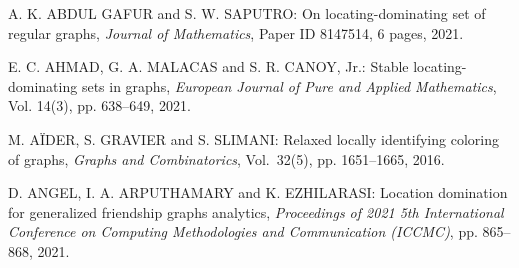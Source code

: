 \begin{thebibliography}{999}
%
%
%
%
%
%
%
%
%
%
%

A. K. ABDUL GAFUR and S. W. SAPUTRO: On locating-dominating set of regular graphs, {\it Journal of Mathematics}, Paper ID 8147514, 6 pages, 2021.

E. C. AHMAD, G. A. MALACAS and S. R. CANOY, Jr.: Stable locating-dominating sets in graphs, {\it European Journal of Pure and Applied Mathematics}, Vol. 14(3), pp. 638--649, 2021.

M. A\"IDER, S. GRAVIER and S. SLIMANI: Relaxed locally identifying coloring of graphs, {\it Graphs and Combinatorics}, Vol.~32(5), pp. 1651--1665, 2016.

D. ANGEL, I. A. ARPUTHAMARY and K. EZHILARASI:  Location domination for generalized friendship graphs analytics, {\it Proceedings of 2021 5th International Conference on Computing Methodologies and Communication (ICCMC)}, pp. 865--868, 2021.


\end{thebibliography}
